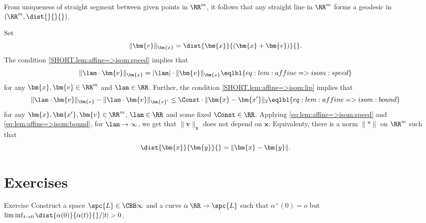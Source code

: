 From uniqueness of straight segment between given points in $\RR^m$,
it follows that any straight line in $\RR^m$ forms a geodesic in $(\RR^m,\dist{}{}{})$.

Set 
\[\|\bm{v}\|_{\bm{x}}=\dist{\bm{x}}{(\bm{x}+\bm{v})}{}.\]
The condition \ref{SHORT.lem:affine=>isom:speed} implies that 
\[ \|\lam\cdot\bm{v}\|_{\bm{x}}
=
|\lam|\cdot\|\bm{v}\|_{\bm{x}}
\eqlbl{eq:lem:affine=>isom:speed}\]
for any $\bm{x},\bm{v}\in\RR^m$ and $\lam\in\RR$.
Further, the condition \ref{SHORT.lem:affine=>isom:lip} implies that 
\[
\|\lam\cdot\bm{v}\|_{\bm{x}}
-
\|\lam\cdot\bm{v}\|_{\bm{x}'}
\le 
\Const\cdot \|\bm{x}-\bm{x'}\|_2
\eqlbl{eq:lem:affine=>isom:bound}\]
for any $\bm{x},\bm{x'},\bm{v}\in\RR^m$, 
$\lam\in\RR$
and some fixed $\Const\in\RR$.
Applying \ref{eq:lem:affine=>isom:speed} and \ref{eq:lem:affine=>isom:bound},
for $\lam\to\infty$, we get
 that
$\|\bm{v}\|_{\bm{x}}$ does not depend on $\bm{x}$.
Equivalenty, there is a norm $\|{*}\|$ on $\RR^m$ such that
\[\dist{\bm{x}}{\bm{y}}{}=\|\bm{x}-\bm{y}\|.\]
\qedsf



\section{Exercises}

\begin{thm}{Exercise}
Construct a space $\spc{L}\in\CBB\infty{}$ and a curve $\alpha\:\RR\to \spc{L}$ such that 
$\alpha^+(0)=o$ 
but $\liminf_{t\to 0}\dist{\alpha(0)}{\alpha(t)}{}/|t|>0$.
\end{thm}













